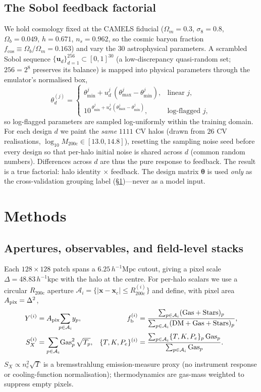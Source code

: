 \documentclass[11pt]{article}
\newcommand{\fb}{f_{\mathrm{b}}}
\newcommand{\hMpc}{h^{-1}\mathrm{Mpc}}
\newcommand{\hkpc}{h^{-1}\mathrm{kpc}}
\newcommand{\Ysz}{Y}
\newcommand{\Sx}{S_X}
\newcommand{\Rtwo}{R_{200\mathrm{c}}}
\newcommand{\Mtwo}{M_{200\mathrm{c}}}
\newcommand{\thetav}{\bm{\theta}}
\begin{document}
\subsection{The Sobol feedback factorial}
\label{sec:sobol}
We hold cosmology fixed at the CAMELS fiducial
($\Omega_m=0.3$, $\sigma_8=0.8$, $\Omega_b=0.049$, $h=0.671$, $n_s=0.962$, so the
cosmic baryon fraction $f_{\mathrm{cos}}\equiv\Omega_b/\Omega_m=0.163$) and vary the
$30$ astrophysical parameters. A scrambled Sobol sequence
$\{\bm{u}_d\}_{d=1}^{256}\subset[0,1]^{30}$ (a low-discrepancy quasi-random set;
$256=2^8$ preserves its balance) is mapped into physical parameters through the
emulator's normalised box,
\begin{equation}
\theta^{(j)}_{d}=
\begin{cases}
\theta^{j}_{\min}+u^{j}_{d}\,(\theta^{j}_{\max}-\theta^{j}_{\min}), & \text{linear } j,\\[2pt]
10^{\,\theta^{j}_{\min}+u^{j}_{d}\,(\theta^{j}_{\max}-\theta^{j}_{\min})}, & \text{log-flagged } j,
\end{cases}
\end{equation}
so log-flagged parameters are sampled log-uniformly within the training domain. For
each design $d$ we paint the \emph{same} $1111$ CV halos (drawn from $26$ CV
realisations, $\log_{10}\Mtwo\in[13.0,14.8]$), resetting the sampling noise seed
before every design so that per-halo initial noise is shared across $d$
(common random numbers). Differences across $d$ are thus the pure response to
feedback. The result is a true factorial: halo identity $\times$ feedback. The design
matrix $\thetav$ is used \emph{only} as the cross-validation grouping label
(\S\ref{sec:methods})---never as a model input.

\section{Methods}
\label{sec:methods}

\subsection{Apertures, observables, and field-level stacks}
\label{sec:stacks}
Each $128\times128$ patch spans a $6.25\,\hMpc$ cutout, giving a pixel scale
$\Delta=48.83\,\hkpc$ with the halo at the centre. For per-halo scalars we use a
circular $\Rtwo$ aperture $\mathcal{A}_i=\{|\bm{x}-\bm{x}_c|\le \Rtwo^{(i)}\}$ and
define, with pixel area $A_{\rm pix}=\Delta^2$,
\begin{align}
\Ysz^{(i)} &= A_{\rm pix}\!\!\sum_{p\in\mathcal{A}_i}\! y_p, &
\fb^{(i)} &= \frac{\sum_{p\in\mathcal{A}_i}(\mathrm{Gas}+\mathrm{Stars})_p}
{\sum_{p\in\mathcal{A}_i}(\mathrm{DM}+\mathrm{Gas}+\mathrm{Stars})_p}, \\
\Sx^{(i)} &= \sum_{p\in\mathcal{A}_i}\!\mathrm{Gas}_p^{2}\,\sqrt{T_p}, &
\{T,K,P_e\}^{(i)} &= \frac{\sum_{p\in\mathcal{A}_i}\{T,K,P_e\}_p\,\mathrm{Gas}_p}
{\sum_{p\in\mathcal{A}_i}\mathrm{Gas}_p}.
\end{align}
$\Sx\propto n_e^2\sqrt{T}$ is a bremsstrahlung emission-measure proxy (no
instrument response or cooling-function normalisation); thermodynamics are
gas-mass weighted to suppress empty pixels.
\end{document}
